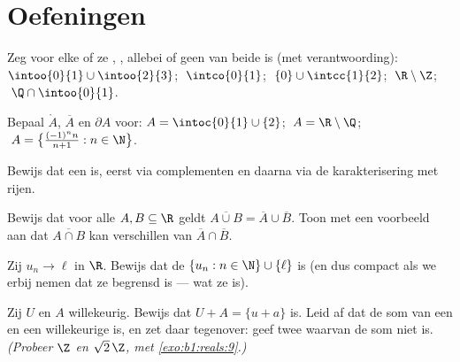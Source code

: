 \section{Oefeningen}

\begin{exercise}[$\star$]\label{exo:b1:topology:1}
Zeg voor elke  of ze , , allebei of geen van beide
is (met verantwoording): $\intoo{0}{1} \cup \intoo{2}{3}$;
$\;\intco{0}{1}$; $\;\{0\} \cup \intcc{1}{2}$; $\;\R \setminus \Z$;
$\;\Q \cap \intoo{0}{1}$.
\end{exercise}

\begin{exercise}[$\star$]\label{exo:b1:topology:2}
Bepaal $\mathring A$, $\overline A$ en $\partial A$ voor: $A =
\intoc{0}{1} \cup \{2\}$; $\;A = \R \setminus \Q$; $\;A =
\bigl\{\frac{(-1)^n n}{n+1} : n \in \N\bigr\}$.
\end{exercise}

\begin{exercise}[$\star$]\label{exo:b1:topology:3}
Bewijs dat een   is, eerst via complementen en
daarna via de karakterisering met rijen.
\end{exercise}

\begin{exercise}[$\star$]\label{exo:b1:topology:4}
Bewijs dat voor alle $A, B \subseteq \R$ geldt $\overline{A \cup B} =
\overline A \cup \overline B$. Toon met een voorbeeld aan dat
$\overline{A \cap B}$ kan verschillen van $\overline A \cap \overline B$.
\end{exercise}

\begin{exercise}[$\star\star$]\label{exo:b1:topology:5}
Zij $u_n \to \ell$ in $\R$. Bewijs dat de  $\{u_n : n \in \N\}
\cup \{\ell\}$  is (en dus compact als we erbij nemen dat ze
begrensd is --- wat ze is).
\end{exercise}

\begin{exercise}[$\star\star$]\label{exo:b1:topology:6}
Zij $U$  en $A$ willekeurig. Bewijs dat $U + A = \{u + a\}$  is.
Leid af dat de som van een  en een willekeurige
  is, en zet daar tegenover: geef twee \emph{}
 waarvan de som niet  is. \emph{(Probeer $\Z$ en
$\sqrt 2\,\Z$, met \cref{exo:b1:reals:9}.)}
\end{exercise}

